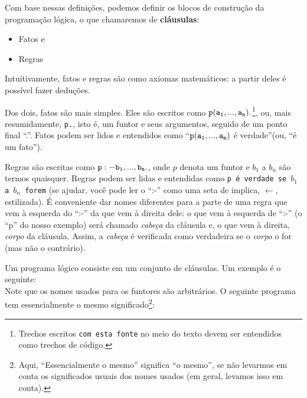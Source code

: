 \documentclass{article}
\theoremstyle{remark}
\begin{document}
Com base nessas definições, podemos definir os blocos de construção da programação lógica, o que chamaremos de \textbf{cláusulas}:
\begin{itemize}
  \item Fatos e
  \item Regras
\end{itemize}

Intuitivamente, fatos e regras são como axiomas matemáticos: a partir deles é possível fazer deduções.

Dos dois, fatos são mais simples. Eles são escritos como  ${\tt p(a_1, ..., a_n).}$\footnote{Trechos escritos {\tt com esta fonte} no meio do texto devem ser entendidos como trechos de código.},  ou, mais resumidamente, {\tt p.}, isto é, um funtor e seus argumentos, seguido de um ponto final ``.''. Fatos podem ser lidos e entendidos como ``${\tt p(a_1, ..., a_n)}$ é verdade''(ou, ``é um fato'').

Regras são escritas como ${\tt p :- b_1, ..., b_n.}$, onde $p$ denota um funtor e $b_1$ a $b_n$ são termos quaisquer. Regras podem ser lidas e entendidas como {\tt p é verdade se $b_1$ a $b_n$ forem} (se ajudar, você pode ler o ``:-'' como uma seta de implica, $\leftarrow$, estilizada). É conveniente dar nomes diferentes para a parte de uma regra que vem à esquerda do ``:-'' da que vem à direita dele: o que vem à esquerda de ``:-'' (o ``p'' do nosso exemplo) será chamado \textit{cabeça} da cláusula e, o que vem à direita, \textit{corpo} da cláusula. Assim, a
\textit{cabeça} é verificada como verdadeira se o \textit{corpo} o for (mas não o contrário).

Um programa lógico consiste em um conjunto de cláusulas. Um exemplo é o seguinte:\\



Note que os nomes usados para os funtores são arbitrários. O seguinte programa tem essencialmente o mesmo significado\footnote{ Aqui, ``Essencialmente o mesmo'' significa ``o mesmo'', se não levarmos em conta os significados usuais dos nomes usados (em geral, levamos isso em conta).}:\\


\end{document}

